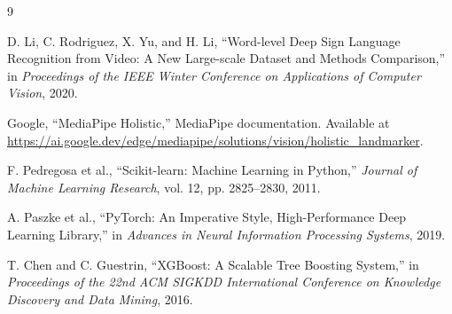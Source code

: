 \documentclass[12pt,a4paper,oneside]{report}
\begin{document}
\begin{thebibliography}{9}
D. Li, C. Rodriguez, X. Yu, and H. Li, ``Word-level Deep Sign Language Recognition from Video: A New Large-scale Dataset and Methods Comparison,'' in \emph{Proceedings of the IEEE Winter Conference on Applications of Computer Vision}, 2020.

Google, ``MediaPipe Holistic,'' MediaPipe documentation. Available at \url{https://ai.google.dev/edge/mediapipe/solutions/vision/holistic_landmarker}.

F. Pedregosa et al., ``Scikit-learn: Machine Learning in Python,'' \emph{Journal of Machine Learning Research}, vol. 12, pp. 2825--2830, 2011.

A. Paszke et al., ``PyTorch: An Imperative Style, High-Performance Deep Learning Library,'' in \emph{Advances in Neural Information Processing Systems}, 2019.

T. Chen and C. Guestrin, ``XGBoost: A Scalable Tree Boosting System,'' in \emph{Proceedings of the 22nd ACM SIGKDD International Conference on Knowledge Discovery and Data Mining}, 2016.
\end{thebibliography}
\end{document}
